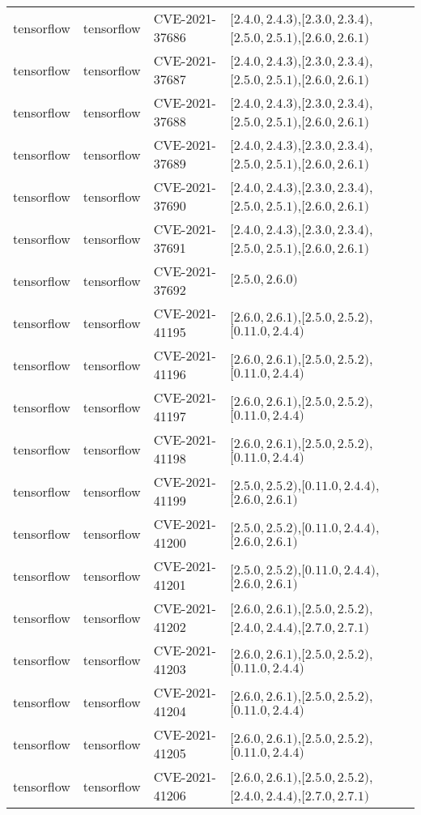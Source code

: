 \begin{tabular}{llll}
tensorflow & tensorflow & CVE-2021-37686 & $[2.4.0,2.4.3)$,$[2.3.0,2.3.4)$,$[2.5.0,2.5.1)$,$[2.6.0,2.6.1)$ \\
tensorflow & tensorflow & CVE-2021-37687 & $[2.4.0,2.4.3)$,$[2.3.0,2.3.4)$,$[2.5.0,2.5.1)$,$[2.6.0,2.6.1)$ \\
tensorflow & tensorflow & CVE-2021-37688 & $[2.4.0,2.4.3)$,$[2.3.0,2.3.4)$,$[2.5.0,2.5.1)$,$[2.6.0,2.6.1)$ \\
tensorflow & tensorflow & CVE-2021-37689 & $[2.4.0,2.4.3)$,$[2.3.0,2.3.4)$,$[2.5.0,2.5.1)$,$[2.6.0,2.6.1)$ \\
tensorflow & tensorflow & CVE-2021-37690 & $[2.4.0,2.4.3)$,$[2.3.0,2.3.4)$,$[2.5.0,2.5.1)$,$[2.6.0,2.6.1)$ \\
tensorflow & tensorflow & CVE-2021-37691 & $[2.4.0,2.4.3)$,$[2.3.0,2.3.4)$,$[2.5.0,2.5.1)$,$[2.6.0,2.6.1)$ \\
tensorflow & tensorflow & CVE-2021-37692 & $[2.5.0,2.6.0)$ \\
tensorflow & tensorflow & CVE-2021-41195 & $[2.6.0,2.6.1)$,$[2.5.0,2.5.2)$,$[0.11.0,2.4.4)$ \\
tensorflow & tensorflow & CVE-2021-41196 & $[2.6.0,2.6.1)$,$[2.5.0,2.5.2)$,$[0.11.0,2.4.4)$ \\
tensorflow & tensorflow & CVE-2021-41197 & $[2.6.0,2.6.1)$,$[2.5.0,2.5.2)$,$[0.11.0,2.4.4)$ \\
tensorflow & tensorflow & CVE-2021-41198 & $[2.6.0,2.6.1)$,$[2.5.0,2.5.2)$,$[0.11.0,2.4.4)$ \\
tensorflow & tensorflow & CVE-2021-41199 & $[2.5.0,2.5.2)$,$[0.11.0,2.4.4)$,$[2.6.0,2.6.1)$ \\
tensorflow & tensorflow & CVE-2021-41200 & $[2.5.0,2.5.2)$,$[0.11.0,2.4.4)$,$[2.6.0,2.6.1)$ \\
tensorflow & tensorflow & CVE-2021-41201 & $[2.5.0,2.5.2)$,$[0.11.0,2.4.4)$,$[2.6.0,2.6.1)$ \\
tensorflow & tensorflow & CVE-2021-41202 & $[2.6.0,2.6.1)$,$[2.5.0,2.5.2)$,$[2.4.0,2.4.4)$,$[2.7.0,2.7.1)$ \\
tensorflow & tensorflow & CVE-2021-41203 & $[2.6.0,2.6.1)$,$[2.5.0,2.5.2)$,$[0.11.0,2.4.4)$ \\
tensorflow & tensorflow & CVE-2021-41204 & $[2.6.0,2.6.1)$,$[2.5.0,2.5.2)$,$[0.11.0,2.4.4)$ \\
tensorflow & tensorflow & CVE-2021-41205 & $[2.6.0,2.6.1)$,$[2.5.0,2.5.2)$,$[0.11.0,2.4.4)$ \\
tensorflow & tensorflow & CVE-2021-41206 & $[2.6.0,2.6.1)$,$[2.5.0,2.5.2)$,$[2.4.0,2.4.4)$,$[2.7.0,2.7.1)$ \\

\end{tabular}
